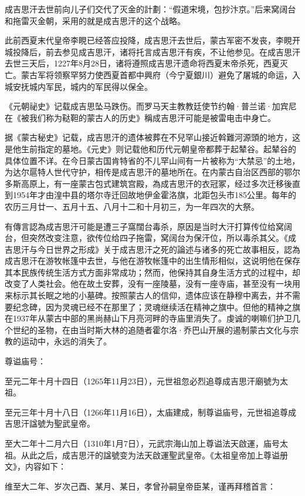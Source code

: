 成吉思汗去世前向儿子们交代了灭金的計劃：“假道宋境，包抄汴京。”后来窝阔台和拖雷灭金朝，采用的就是成吉思汗的这个战略。

此前西夏末代皇帝李睍已经答应投降，成吉思汗去世后，蒙古军密不发丧，李睍开城投降后，前去参见成吉思汗，诸将托言成吉思汗有疾，不让他参见。在成吉思汗去世三天后，1227年8月28日，诸将遵照成吉思汗遗命将西夏末帝杀死，西夏灭亡。蒙古军将领察罕努力使西夏首都中興府（今宁夏銀川）避免了屠城的命运，入城安抚城内军民，城内的军民得以保全。

《元朝祕史》记载成吉思坠马跌伤。而罗马天主教教廷使节约翰·普兰诺·加宾尼在《被我们称为鞑靼的蒙古人的历史》稱成吉思汗可能是被雷电击中身亡。

据《蒙古秘史》记载，成吉思汗的遗体被葬在不兒罕山接近斡難河源頭的地方，这是他生前指定的墓地。《元史》则记载他和历代元朝皇帝都葬于起辇谷。起辇谷的具体位置不详。在今日蒙古国肯特省的不儿罕山间有一片被称为“大禁忌”的土地，为达尔扈特人世代守护，相传是成吉思汗的墓地所在。在内蒙古自治区西部的鄂尔多斯高原上，有一座蒙古包式建筑宫殿，為成吉思汗的衣冠冢，经过多次迁移後直到1954年才由湟中县的塔尔寺迁回故地伊金霍洛旗，北距包头市185公里。每年的农历三月廿一、五月十五、八月十二和十月初三，为一年四次的大祭。

有傳言認為成吉思汗可能是遭三子窩闊台毒杀，原因是当时大汗打算传位给窝阔台，但突然改变注意，欲传位给四子拖雷，窝阔台为保汗位，所以毒杀其父。《成吉思汗与今日世界之形成》关于成吉思汗之死的論述与诸多的死亡故事相反，認為成吉思汗在游牧帐篷中去世，与他在游牧帐篷中的出生情形相似，这说明他在保存其本民族传统生活方式方面非常成功；然而，他保持其自身生活方式的过程中，却改变了人类社会。他在故土安葬，没有一座陵墓，没有一座寺庙，甚至没有一块用来标示其长眠之地的小墓碑。按照蒙古人的信仰，遗体应该在静穆中离去，并不需要纪念碑，因为灵魂已经不在那里了；灵魂继续活在精神之旗中。但他的精神之旗在1937年从蒙古中部的黑尚赫山下月亮河畔的寺庙里消失了。虔诚的喇嘛们护卫几个世纪的圣物，在由当时斯大林的追随者霍尔洛·乔巴山开展的遏制蒙古文化与宗教的运动中，永远的消失了。

尊谥庙号：

至元二年十月十四日（1265年11月23日），元世祖忽必烈追尊成吉思汗廟號为太祖。

至元三年十月十八日（1266年11月16日），太庙建成，制尊谥庙号，元世祖追尊成吉思汗諡號为聖武皇帝。

至大二年十二月六日（1310年1月7日），元武宗海山加上尊谥法天啟運，庙号太祖。从此之后，成吉思汗的諡號变为法天啟運聖武皇帝。《太祖皇帝加上尊谥册文》，内容如下：

维至大二年、岁次己酉、某月、某日，孝曾孙嗣皇帝臣某，谨再拜稽首言：

